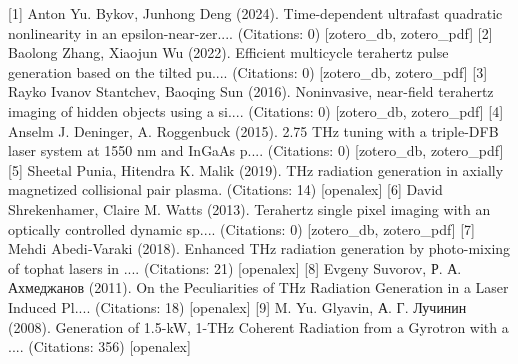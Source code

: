 \documentclass[12pt]{article}
\begin{document}
[1] Anton Yu. Bykov, Junhong Deng (2024). Time-dependent ultrafast quadratic nonlinearity in an epsilon-near-zer.... (Citations: 0) [zotero_db, zotero_pdf]
[2] Baolong Zhang, Xiaojun Wu (2022). Efficient multicycle terahertz pulse generation based on the tilted pu.... (Citations: 0) [zotero_db, zotero_pdf]
[3] Rayko Ivanov Stantchev, Baoqing Sun (2016). Noninvasive, near-field terahertz imaging of hidden objects using a si.... (Citations: 0) [zotero_db, zotero_pdf]
[4] Anselm J. Deninger, A. Roggenbuck (2015). 2.75 THz tuning with a triple-DFB laser system at 1550 nm and InGaAs p.... (Citations: 0) [zotero_db, zotero_pdf]
[5] Sheetal Punia, Hitendra K. Malik (2019). THz radiation generation in axially magnetized collisional pair plasma. (Citations: 14) [openalex]
[6] David Shrekenhamer, Claire M. Watts (2013). Terahertz single pixel imaging with an optically controlled dynamic sp.... (Citations: 0) [zotero_db, zotero_pdf]
[7] Mehdi Abedi‐Varaki (2018). Enhanced THz radiation generation by photo-mixing of tophat lasers in .... (Citations: 21) [openalex]
[8] Evgeny Suvorov, Р. А. Ахмеджанов (2011). On the Peculiarities of THz Radiation Generation in a Laser Induced Pl.... (Citations: 18) [openalex]
[9] M. Yu. Glyavin, А. Г. Лучинин (2008). Generation of 1.5-kW, 1-THz Coherent Radiation from a Gyrotron with a .... (Citations: 356) [openalex]




\end{document}
